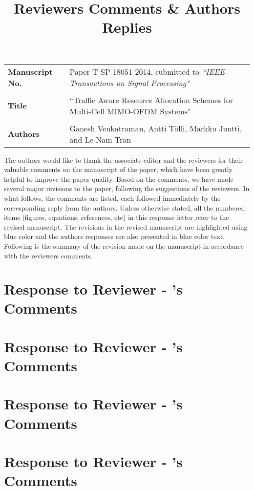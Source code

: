 \documentclass[10pt,letterpaper,onecolumn]{article}
\begin{document}
\title{Reviewers Comments \& Authors Replies}

\date{}
\maketitle

\begin{tabular}{p{1.25in}p{4.25in}}
\textbf{Manuscript No.} & Paper T-SP-18051-2014, submitted to \emph{``IEEE Transactions on Signal Processing"} \\ \\
\textbf{Title} & ``Traffic Aware Resource Allocation Schemes for Multi-Cell MIMO-OFDM Systems" \\ \\
\textbf{Authors} & Ganesh Venkatraman, Antti T\"{o}lli, Markku Juntti, and Le-Nam Tran
\end{tabular}

\vspace{0.5in}
The authors would like to thank the associate editor and the reviewers for their valuable comments on the manuscript of the paper, which have been greatly helpful to improve the paper quality. Based on the comments, we have made several major revisions to the paper, following the suggestions of the reviewers. In what follows, the comments are listed, each followed immediately by the corresponding reply from the authors. Unless otherwise stated, all the numbered items (figures, equations, references, etc) in this response letter refer to the revised manuscript. The revisions in the revised manuscript are highlighted using blue color and the authors responses are also presented in blue color text. Following is the summary of the revision made on the manuscript in accordance with the reviewers comments.


\newpage
\section*{Response to Reviewer - 's Comments}


\newpage
\section*{Response to Reviewer - 's Comments}


\newpage
\section*{Response to Reviewer - 's Comments}


\newpage
\section*{Response to Reviewer - 's Comments}

\end{document}

